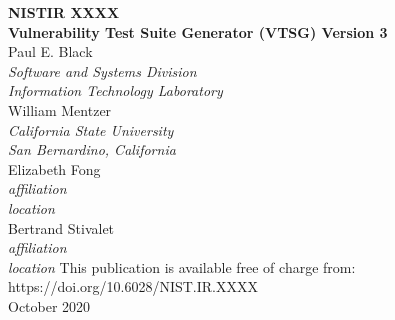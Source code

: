 \documentclass[12pt]{article}
\newcommand{\pubnumber}{XXXX}
\newcommand{\DOI}{https://doi.org/10.6028/NIST.IR.XXXX}
\newcommand{\monthyear}{October 2020}
\newcommand{\paperTitle}{Vulnerability Test Suite Generator (VTSG) Version 3}
\begin{document}
\begin{titlepage}
\begin{flushright}
\LARGE{\textbf{NISTIR \pubnumber}}\\
\vfill 
\Huge{\textbf{\paperTitle}}\\
    \vfill
    \normalsize 
    Paul E. Black\\
     \textit{Software and Systems Division}\\
     \textit{Information Technology Laboratory}\\
     \vspace{12pt}
    William Mentzer\\
     \textit{California State University}\\
     \textit{San Bernardino, California}\\
     \vspace{12pt}
    Elizabeth Fong \\
     \textit{affiliation}\\
     \textit{location}\\
     \vspace{12pt}
    Bertrand Stivalet \\
     \textit{affiliation}\\
     \textit{location}
\vfill
\normalsize This publication is available free of charge from:\\
\DOI\\
\vfill
\normalsize \monthyear
\vfill


\end{flushright}
\end{titlepage}
\end{document}
